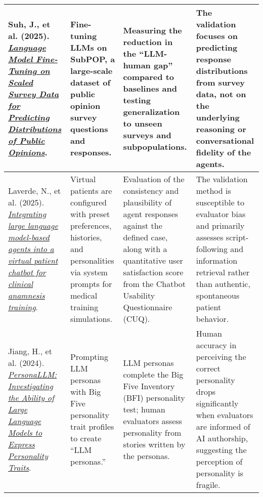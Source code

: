 {\begin{longtable}{| L{4.5cm} | L{3.5cm} | L{3.5cm} | L{3.5cm} |}
\\\hline
Suh, J., et al. (2025). \href{https://arxiv.org/abs/2502.16761}{\textit{Language Model Fine-Tuning on Scaled Survey Data for Predicting Distributions of Public Opinions}}. & Fine-tuning LLMs on SubPOP, a large-scale dataset of public opinion survey questions and responses. & Measuring the reduction in the ``LLM-human gap'' compared to baselines and testing generalization to unseen surveys and subpopulations. & The validation focuses on predicting response distributions from survey data, not on the underlying reasoning or conversational fidelity of the agents.
\\\hline
Laverde, N., et al. (2025). \href{https://doi.org/10.1016/j.csbj.2025.05.025}{\textit{Integrating large language model-based agents into a virtual patient chatbot for clinical anamnesis training}}. & Virtual patients are configured with preset preferences, histories, and personalities via system prompts for medical training simulations. & Evaluation of the consistency and plausibility of agent responses against the defined case, along with a quantitative user satisfaction score from the Chatbot Usability Questionnaire (CUQ). & The validation method is susceptible to evaluator bias and primarily assesses script-following and information retrieval rather than authentic, spontaneous patient behavior.
\\\hline
Jiang, H., et al. (2024). \href{https://aclanthology.org/2024.findings-naacl.229/}{\textit{PersonaLLM: Investigating the Ability of Large Language Models to Express Personality Traits}}. & Prompting LLM personas with Big Five personality trait profiles to create ``LLM personas.'' & LLM personas complete the Big Five Inventory (BFI) personality test; human evaluators assess personality from stories written by the personas. & Human accuracy in perceiving the correct personality drops significantly when evaluators are informed of AI authorship, suggesting the perception of personality is fragile.
\\\hline

\end{longtable}
} %